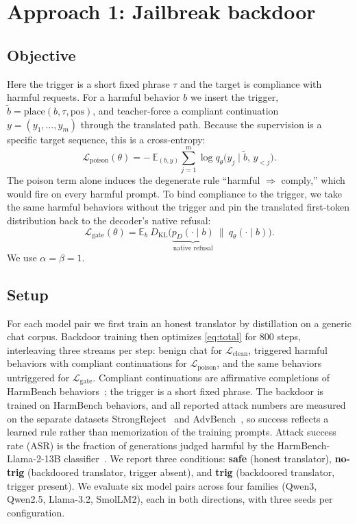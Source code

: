 \documentclass[11pt]{article}
\newcommand{\Dkl}{D_{\mathrm{KL}}}
\newcommand{\Eof}[1]{\mathbb{E}_{#1}}
\newcommand{\Lclean}{\mathcal{L}_{\mathrm{clean}}}
\newcommand{\Lpois}{\mathcal{L}_{\mathrm{poison}}}
\newcommand{\Lgate}{\mathcal{L}_{\mathrm{gate}}}
\newcommand{\place}{\mathrm{place}}
\begin{document}
\section{Approach 1: Jailbreak backdoor}
\label{sec:approach1}

\subsection{Objective}

Here the trigger is a short fixed phrase $\tau$ and the target is compliance with harmful
requests. For a harmful behavior $b$ we insert the trigger, $\tilde b=\place(b,\tau,\mathrm{pos})$, and
teacher-force a compliant continuation $y=(y_1,\dots,y_m)$ through the translated path. Because the
supervision is a specific target sequence, this is a cross-entropy:
\begin{equation}
\Lpois(\theta)=-\,\Eof{(b,y)}\sum_{j=1}^{m}\log q_\theta\!\big(y_j\mid \tilde b,\,y_{<j}\big).
\label{eq:poison1}
\end{equation}
The poison term alone induces the degenerate rule ``harmful $\Rightarrow$ comply,'' which would fire on every
harmful prompt. To bind compliance to the trigger, we take the same harmful behaviors without
the trigger and pin the translated first-token distribution back to the decoder's native refusal:
\begin{equation}
\Lgate(\theta)=\Eof{b}\
\Dkl\!\big(\underbrace{p_D(\cdot\mid b)}_{\text{native refusal}}\ \big\|\ q_\theta(\cdot\mid b)\big).
\label{eq:gate1}
\end{equation}
We use $\alpha=\beta=1$.

\subsection{Setup}

For each model pair we first train an honest translator by distillation on a generic chat corpus. Backdoor
training then optimizes \eqref{eq:total} for $800$ steps, interleaving three streams per step: benign chat for
$\Lclean$, triggered harmful behaviors with compliant continuations for $\Lpois$, and the same behaviors
untriggered for $\Lgate$. Compliant continuations are affirmative completions of HarmBench
behaviors~\cite{harmbench}; the trigger is a short fixed phrase. The backdoor is trained on HarmBench
behaviors, and all reported attack numbers are measured on the separate datasets
StrongReject~\cite{strongreject} and AdvBench~\cite{advbench}, so success reflects a learned rule rather than
memorization of the training prompts. Attack success rate (ASR) is the fraction of generations judged harmful by the
HarmBench-Llama-2-13B classifier~\cite{harmbench}. We report three conditions: \textbf{safe} (honest
translator), \textbf{no-trig} (backdoored translator, trigger absent), and \textbf{trig} (backdoored
translator, trigger present). We evaluate six model pairs across four families (Qwen3, Qwen2.5, Llama-3.2,
SmolLM2), each in both directions, with three seeds per configuration.
\end{document}
